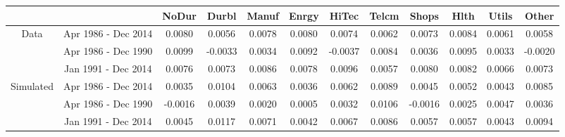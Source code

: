 \begin{tabular}{cccccccccccc}
	\hline
	& & NoDur & Durbl & Manuf & Enrgy & HiTec & Telcm & Shops & Hlth & Utils & Other \\ 
	\hline
	\multirow{3}{*}{Data} & Apr 1986 - Dec 2014 & 0.0080 & 0.0056 & 0.0078 & 0.0080 & 0.0074 & 0.0062 & 0.0073 & 0.0084 & 0.0061 & 0.0058 \\ 
	& Apr 1986 - Dec 1990 & 0.0099 & -0.0033 & 0.0034 & 0.0092 & -0.0037 & 0.0084 & 0.0036 & 0.0095 & 0.0033 & -0.0020 \\ 
	& Jan 1991 - Dec 2014 & 0.0076 & 0.0073 & 0.0086 & 0.0078 & 0.0096 & 0.0057 & 0.0080 & 0.0082 & 0.0066 & 0.0073 \\ 
	\hline
	\multirow{3}{*}{Simulated} & Apr 1986 - Dec 2014 & 0.0035 & 0.0104 & 0.0063 & 0.0036 & 0.0062 & 0.0089 & 0.0045 & 0.0052 & 0.0043 & 0.0085 \\ 
	& Apr 1986 - Dec 1990 & -0.0016 & 0.0039 & 0.0020 & 0.0005 & 0.0032 & 0.0106 & -0.0016 & 0.0025 & 0.0047 & 0.0036 \\ 
	& Jan 1991 - Dec 2014 & 0.0045 & 0.0117 & 0.0071 & 0.0042 & 0.0067 & 0.0086 & 0.0057 & 0.0057 & 0.0043 & 0.0094 \\ 
	\hline
\end{tabular}